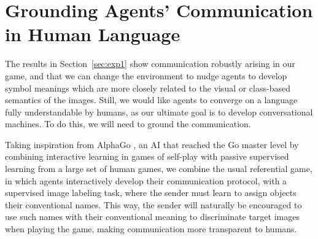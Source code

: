 \section{Grounding Agents' Communication in Human Language}
The results in Section~\ref{sec:exp1} show  communication robustly
arising in our game, and that we can change the environment to nudge agents 
to develop symbol meanings which are more closely related to the visual or class-based semantics of the images. %
Still, we would like agents to converge on a language fully
understandable by humans, as our ultimate goal is to develop
conversational machines. To do this, we will need to ground the
communication.%

Taking inspiration from AlphaGo \citep{Silver:etal:2016}, an AI that
reached the Go master level by combining interactive learning in games
of self-play with passive supervised learning from a large set of
human games, we combine the usual referential game, in which agents
interactively develop their communication protocol, with a supervised
image labeling task, where the sender must learn to assign objects
their conventional names. This way, the sender will naturally be
encouraged to use such names with their conventional meaning to
discriminate target images when playing the game, making communication
more transparent to humans.

